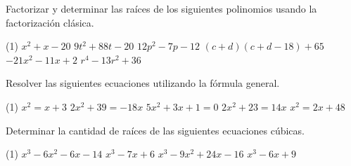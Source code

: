 \begin{multicols}{2}
    \begin{exercise}
        Factorizar y determinar las raíces de los siguientes polinomios usando la factorización clásica.
        \begin{tasks}[label=\Alph*)](1)
        \task $x^2 + x - 20$
        \task $9t^2 + 88t - 20$
        \task $12p^2 - 7p - 12$
        \task $(c + d)(c + d - 18) + 65$
        \task $-21x^2 - 11x + 2$
        \task $r^4 - 13r^2 + 36$
        \end{tasks}
    \end{exercise}

    \begin{exercise}
        Resolver las siguientes ecuaciones utilizando la fórmula general.
        \begin{tasks}[label=\Alph*)](1)
        \task $x^2 = x + 3$
        \task $2x^2 + 39 = -18x$
        \task $5x^2 + 3x + 1 = 0$
        \task $2x^2 + 23 = 14x$
        \task $x^2 = 2x + 48$
        \end{tasks}
    \end{exercise}

    \begin{exercise}
        Determinar la cantidad de raíces de las siguientes ecuaciones cúbicas.
        \begin{tasks}[label=\Alph*)](1)
            \task $x^3 - 6x^2 - 6x - 14$
            \task $x^3 - 7x + 6$
            \task $x^3 - 9x^2 + 24x - 16$
            \task $x^3 - 6x + 9$
        \end{tasks}
    \end{exercise}

\end{multicols}